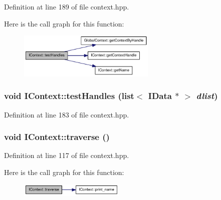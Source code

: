 Definition at line 189 of file context.hpp.

Here is the call graph for this function:\nopagebreak
\begin{figure}[H]
\begin{center}
\leavevmode
\includegraphics[width=185pt]{class_i_context_adff746ec169ed33998d86aa306ee3d93_cgraph}
\end{center}
\end{figure}
\hypertarget{class_i_context_a4448138448c7a2a17ed1cfc3896ac3cf}{
\subsubsection[{testHandles}]{\setlength{\rightskip}{0pt plus 5cm}void IContext::testHandles (list$<$ {\bf IData} $\ast$ $>$ {\em dlist})}}
\label{class_i_context_a4448138448c7a2a17ed1cfc3896ac3cf}


Definition at line 183 of file context.hpp.\hypertarget{class_i_context_a67fac0019748ff482ce820affb8603e2}{
\subsubsection[{traverse}]{\setlength{\rightskip}{0pt plus 5cm}void IContext::traverse ()}}
\label{class_i_context_a67fac0019748ff482ce820affb8603e2}


Definition at line 117 of file context.hpp.

Here is the call graph for this function:\nopagebreak
\begin{figure}[H]
\begin{center}
\leavevmode
\includegraphics[width=142pt]{class_i_context_a67fac0019748ff482ce820affb8603e2_cgraph}
\end{center}
\end{figure}


